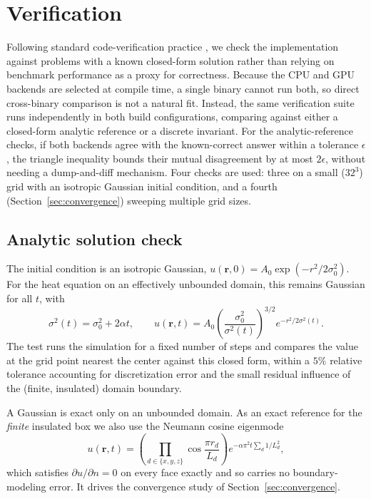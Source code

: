 \documentclass[conference]{IEEEtran}
\begin{document}
\section{Verification}
\label{sec:verification}

Following standard code-verification practice \cite{oberkampf2002}, we check the
implementation against problems with a known closed-form solution rather than relying
on benchmark performance as a proxy for correctness. Because the CPU and GPU backends
are selected at compile time, a single binary cannot
run both, so direct cross-binary comparison is not a natural fit. Instead, the same
verification suite runs independently in both build configurations, comparing against
either a closed-form analytic reference or a discrete invariant. For the
analytic-reference checks, if both backends agree with the known-correct answer within
a tolerance $\epsilon$, the triangle inequality bounds their mutual disagreement by at
most $2\epsilon$, without needing a dump-and-diff mechanism. Four checks are used:
three on a small ($32^3$) grid with an isotropic
Gaussian initial condition, and a fourth (Section~\ref{sec:convergence}) sweeping
multiple grid sizes.

\subsection{Analytic solution check}

The initial condition is an isotropic Gaussian, $u(\mathbf{r}, 0) = A_0 \exp(-r^2 /
2\sigma_0^2)$. For the heat equation on an effectively unbounded domain, this remains
Gaussian for all $t$, with
\begin{equation}
  \sigma^2(t) = \sigma_0^2 + 2\alpha t, \qquad
  u(\mathbf{r}, t) = A_0 \left(\frac{\sigma_0^2}{\sigma^2(t)}\right)^{3/2}
    e^{-r^2 / 2\sigma^2(t)}.
\end{equation}
The test runs the simulation for a fixed number of steps and compares the value at the
grid point nearest the center against this closed form, within a $5\%$ relative
tolerance accounting for discretization error and the small residual influence of the
(finite, insulated) domain boundary.

A Gaussian is exact only on an unbounded domain. As an exact reference for the
\emph{finite} insulated box we also use the Neumann cosine eigenmode
\begin{equation}
  u(\mathbf{r}, t) = \left(\prod_{d \in \{x,y,z\}} \cos\frac{\pi r_d}{L_d}\right)
    e^{-\alpha \pi^2 t \sum_d 1/L_d^2},
  \label{eq:cosine}
\end{equation}
which satisfies $\partial u/\partial n = 0$ on every face exactly and so carries no
boundary-modeling error. It drives the convergence study of
Section~\ref{sec:convergence}.
\end{document}
